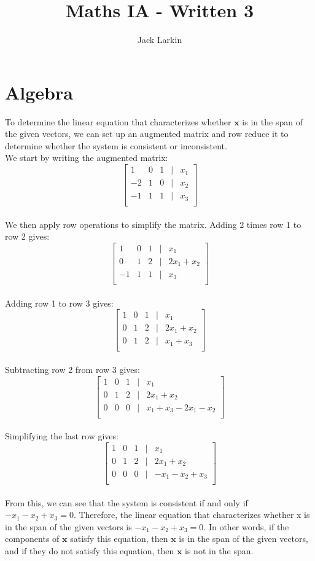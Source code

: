 \documentclass[11pt]{article}
\title{\textbf{Maths IA - Written 3}}
\date{}
\author{Jack Larkin}
\begin{document}
\maketitle

\section*{Algebra}
To determine the linear equation that characterizes whether $\mathbf{x}$ is in the span of the given vectors, we can set up an augmented matrix and row reduce it to determine whether the system is consistent or inconsistent.
\\
We start by writing the augmented matrix:
$$\begin{bmatrix}
1 & 0 & 1 & | & x_1 \\
-2 & 1 & 0 & | & x_2 \\
-1 & 1 & 1 & | & x_3 \\
\end{bmatrix}$$ \\
We then apply row operations to simplify the matrix. Adding 2 times row 1 to row 2 gives:
$$\begin{bmatrix}
1 & 0 & 1 & | & x_1 \\
0 & 1 & 2 & | & 2x_1 + x_2 \\
-1 & 1 & 1 & | & x_3 \\
\end{bmatrix}$$ \\
Adding row 1 to row 3 gives:
$$\begin{bmatrix}
1 & 0 & 1 & | & x_1 \\
0 & 1 & 2 & | & 2x_1 + x_2 \\
0 & 1 & 2 & | & x_1 + x_3 \\
\end{bmatrix}$$ \\
Subtracting row 2 from row 3 gives:
$$\begin{bmatrix}
1 & 0 & 1 & | & x_1 \\
0 & 1 & 2 & | & 2x_1 + x_2 \\
0 & 0 & 0 & | & x_1 + x_3 - 2x_1 -x_2\\
\end{bmatrix}$$ \\
Simplifying the last row gives:
$$\begin{bmatrix}
1 & 0 & 1 & | & x_1 \\
0 & 1 & 2 & | & 2x_1 + x_2 \\
0 & 0 & 0 & | & -x_1 -x_2 + x_3\\
\end{bmatrix}$$ \\
From this, we can see that the system is consistent if and only if $-x_1 - x_2 + x_3 = 0$. Therefore, the linear equation that characterizes whether x is in the span of the given vectors is $-x_1 - x_2 + x_3 = 0$. In other words, if the components of $\mathbf{x}$ satisfy this equation, then $\mathbf{x}$ is in the span of the given vectors, and if they do not satisfy this equation, then $\mathbf{x}$ is not in the span.
\end{document}
